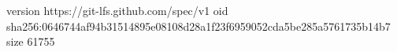 version https://git-lfs.github.com/spec/v1
oid sha256:0646744af94b31514895e08108d28a1f23f6959052cda5be285a5761735b14b7
size 61755
